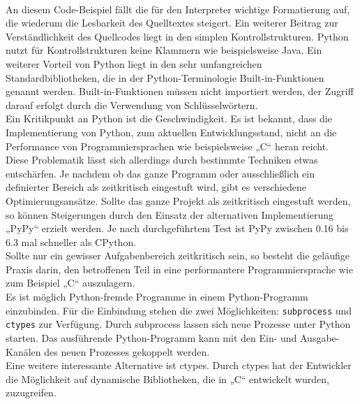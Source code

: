 \documentclass[../Bachelorarbeit.tex]{subfiles}
\begin{document}
\mbox{}\\
An  diesem  Code-Beispiel  fällt  die  für  den  Interpreter  wichtige  Formatierung  auf,  die
wiederum die Lesbarkeit des Quelltextes steigert. Ein weiterer Beitrag zur Verständlichkeit
des Quellcodes liegt in den simplen Kontrollstrukturen. Python nutzt für Kontrollstrukturen
keine Klammern wie beispielsweise Java. 
Ein weiterer Vorteil von Python liegt in den sehr umfangreichen Standardbibliotheken, die 
in der Python-Terminologie Built-in-Funktionen genannt werden. Built-in-Funktionen 
müssen nicht importiert werden, der Zugriff darauf erfolgt durch die Verwendung von 
Schlüsselwörtern. \\
Ein Kritikpunkt an Python ist die Geschwindigkeit. Es ist bekannt, dass die 
Implementierung von Python, zum aktuellen Entwicklungsstand, nicht an die Performance 
von Programmiersprachen wie beispielsweise „C“ heran reicht.
\parencite[vgl.][]{python_vs_c} \\
Diese Problematik lässt sich allerdings durch bestimmte Techniken etwas entschärfen. Je 
nachdem ob das ganze Programm oder ausschließlich ein definierter Bereich als 
zeitkritisch eingestuft wird, gibt es verschiedene Optimierungsansätze. Sollte das ganze 
Projekt als zeitkritisch eingestuft werden, so können Steigerungen durch den Einsatz der 
alternativen Implementierung „PyPy“ erzielt werden. Je nach durchgeführtem Test ist PyPy zwischen 0.16 bis 6.3 mal schneller als CPython.
\parencite[vgl.][]{pypy_speedtest} \\
Sollte nur ein gewisser Aufgabenbereich zeitkritisch sein, so besteht die geläufige Praxis 
darin, den betroffenen Teil in eine performantere Programmiersprache wie zum Beispiel 
„C“ auszulagern.\\
Es ist möglich Python-fremde Programme in einem Python-Programm einzubinden. Für 
die Einbindung stehen die zwei Möglichkeiten: \texttt{subprocess} und \texttt{ctypes} zur Verfügung. 
Durch subprocess lassen sich neue Prozesse unter Python starten. Das ausführende 
Python-Programm kann mit den Ein- und Ausgabe-Kanälen des neuen Prozesses 
gekoppelt werden. \\
Eine weitere interessante Alternative ist ctypes. Durch ctypes hat der Entwickler die 
Möglichkeit auf dynamische Bibliotheken, die in „C“ entwickelt wurden, zuzugreifen. 
\parencite[vgl.][]{ctypes} \\
\end{document}

